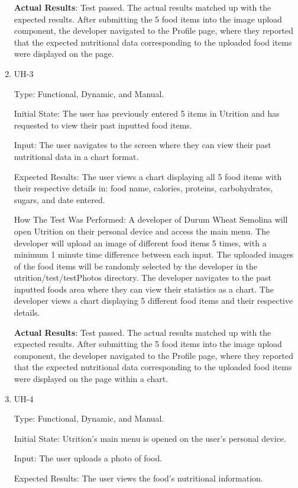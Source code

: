 \documentclass[12pt, titlepage]{article}
\begin{document}
\begin{enumerate}
		\textbf{Actual Results}: Test passed. The actual results matched up with the expected results. After submitting the 5 food items into the image upload component, the developer navigated to the Profile page, where they reported that the expected nutritional data corresponding to the uploaded food items were displayed on the page.
		
		\item{UH-3}
		
		Type: Functional, Dynamic, and Manual.
		
		Initial State: The user has previously entered 5 items in Utrition and has requested to view their past inputted food items.
		
		Input: The user navigates to the screen where they can view their past nutritional data in a chart format.
		
		Expected Results: The user views a chart displaying all 5 food items with their respective details in: food name, calories, proteins, carbohydrates, sugars, and date entered.
		
		How The Test Was Performed: A developer of Durum Wheat Semolina will open Utrition on their personal device and access the main menu. The developer will upload an image of different food items 5 times, with a minimum 1 minute time difference between each input. The uploaded images of the food items will be randomly selected by the developer in the utrition/test/testPhotos directory. The developer navigates to the past inputted foods area where they can view their statistics as a chart. The developer views a chart displaying 5 different food items and their respective details.
		
		\textbf{Actual Results}: Test passed. The actual results matched up with the expected results. After submitting the 5 food items into the image upload component, the developer navigated to the Profile page, where they reported that the expected nutritional data corresponding to the uploaded food items were displayed on the page within a chart.
		
		\item{UH-4}
		
		Type: Functional, Dynamic, and Manual.
		
		Initial State: Utrition’s main menu is opened on the user’s personal device.
		
		Input: The user uploads a photo of food.
		
		Expected Results: The user views the food’s nutritional information.
		

\end{enumerate}
\end{document}
